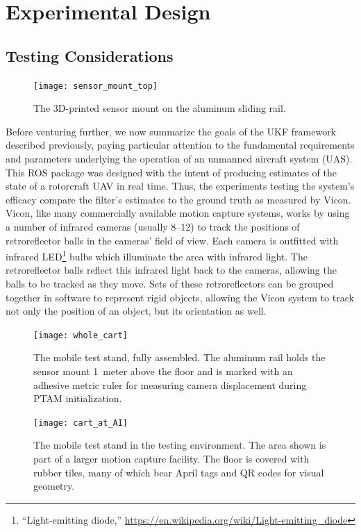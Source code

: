 \chapter{Experimental Design} \label{ch:Exp_Design}

\section{Testing Considerations}

\begin{figure}
        \centering
        \texttt{[image: sensor\_mount\_top]}
        \caption[Sensor Mount Top View]{The 3D-printed sensor mount on the aluminum sliding rail.}
        \label{fig:sensor_mount_top}
\end{figure}

Before venturing further, we now summarize the goals of the UKF framework described previously, paying particular attention to the fundamental requirements and parameters underlying the operation of an unmanned aircraft system (UAS). This ROS package was designed with the intent of producing estimates of the state of a rotorcraft UAV in real time. Thus, the experiments testing the system's efficacy compare the filter's estimates to the ground truth as measured by Vicon. Vicon, like many commercially available motion capture systems, works by using a number of infrared cameras (usually 8--12) to track the positions of retroreflector balls in the cameras' field of view. Each camera is outfitted with infrared LED\footnote{``Light-emitting diode,'' \url{https://en.wikipedia.org/wiki/Light-emitting_diode}} bulbs which illuminate the area with infrared light. The retroreflector balls reflect this infrared light back to the cameras, allowing the balls to be tracked as they move. Sets of these retroreflectors can be grouped together in software to represent rigid objects, allowing the Vicon system to track not only the position of an object, but its orientation as well.

\begin{figure}
  \centering
    \texttt{[image: whole\_cart]}
  \caption[Mobile Test Stand]{The mobile test stand, fully assembled. The aluminum rail holds the sensor mount 1~meter above the floor and is marked with an adhesive metric ruler for measuring camera displacement during PTAM initialization.}
  \label{fig:whole_cart}
\end{figure}

\begin{figure}
  \centering
    \texttt{[image: cart\_at\_AI]}
  \caption[Testing Environment]{The mobile test stand in the testing environment. The area shown is part of a larger motion capture facility. The floor is covered with rubber tiles, many of which bear April tags and QR codes for visual geometry.}
  \label{fig:cart_at_AI}
\end{figure}

